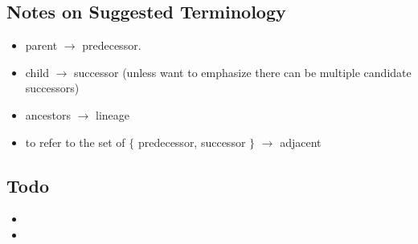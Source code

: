 \subsection{Notes on Suggested Terminology}
\begin{itemize}
\item parent $\rightarrow$ predecessor.
\item child $\rightarrow$ successor (unless want to emphasize there can be multiple candidate successors)
\item ancestors $\rightarrow$ lineage
\item to refer to the set of $\{$ predecessor, successor $\}$ $\rightarrow$ adjacent
\end{itemize}


\subsection{Todo}
\begin{itemize}
\item {}
\item {}
\end{itemize}
